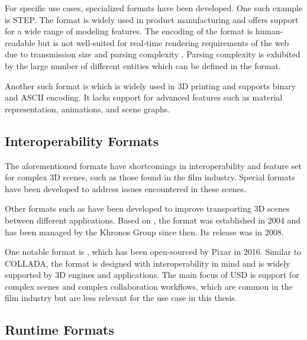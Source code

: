 For specific use cases, specialized formats have been developed. One such example is \gls{STEP}. The format is widely used in product manufacturing and offers support for a wide range of modeling features. The  encoding of the format is human-readable but is not well-suited for real-time rendering requirements of the web due to transmission size and parsing complexity \cite{marjudi2010StepIgesreview}. Parsing complexity is exhibited by the large number of different entities which can be defined in the format.

Another such format is  which is widely used in 3D printing and supports binary and \gls{ASCII} encoding. It lacks support for advanced features such as material representation, animations, and scene graphs.

\subsection*{Interoperability Formats}

The aforementioned formats have shortcomings in interoperability and feature set for complex 3D scenes, such as those found in the film industry. Special formats have been developed to address issues encountered in these scenes.

Other formats such as  have been developed to improve transporting 3D scenes between different applications. Based on , the format was established in 2004 and has been managed by the \gls{Khronos Group} since then. Its release was in 2008.

One notable format is , which has been open-sourced by Pixar in 2016. Similar to \gls{COLLADA}, the format is designed with interoperability in mind and is widely supported by 3D engines and applications. The main focus of \gls{USD} is support for complex scenes and complex collaboration workflows, which are common in the film industry but are less relevant for the use case in this thesis.

\subsection*{Runtime Formats}

